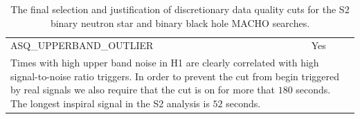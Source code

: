 \begin{table}[p]
\begin{center}
\begin{tabular}{ll}
\\
ASQ\_UPPERBAND\_OUTLIER   & Yes \\
\multicolumn{2}{l}{\parbox{\linewidth}{\footnotesize Times with high upper band
noise in H1 are clearly correlated with high signal-to-noise ratio triggers.
In order to prevent the cut from begin triggered by real signals we also
require that the cut is on for more that $180$ seconds. The longest inspiral
signal in the S2 analysis is $52$ seconds.\baselineskip=14pt}}\\
\end{tabular}
\end{center}
\caption{\label{t:s2dqchoice}%
The final selection and justification of discretionary data quality cuts for
the S2 binary neutron star and binary black hole MACHO searches.}
\end{table}

